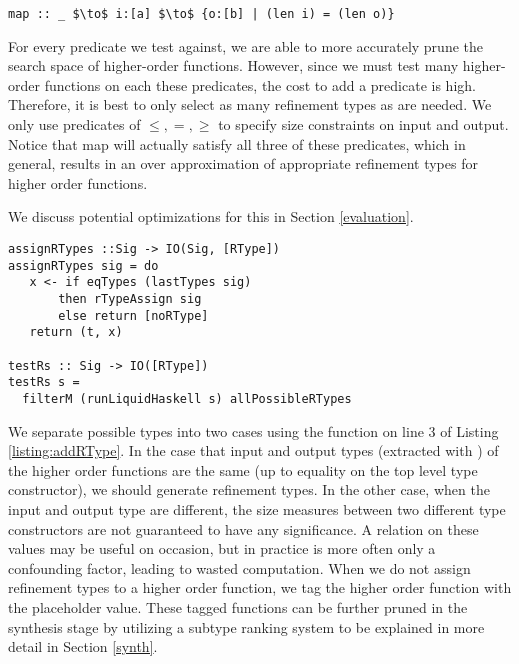 \begin{lstlisting}[numbers=none]
map :: _ $\to$ i:[a] $\to$ {o:[b] | (len i) = (len o)}
\end{lstlisting}


For every predicate we test against, we are able to more accurately prune the search space of higher-order functions.
However, since we must test many higher-order functions on each these predicates, the cost to add a predicate is high.
Therefore, it is best to only select as many refinement types as are needed.
We only use predicates of $\leq,=,\geq$ to specify size constraints on input and output.
Notice that map will actually satisfy all three of these predicates, which in general, results in an over approximation of appropriate refinement types for higher order functions.


We discuss potential optimizations for this in Section \ref{evaluation}.

\begin{lstlisting}[caption=Adding refinement types to higher order functions,label=listing:addRType]
assignRTypes ::Sig -> IO(Sig, [RType])
assignRTypes sig = do
   x <- if eqTypes (lastTypes sig) 
       then rTypeAssign sig
       else return [noRType]
   return (t, x)

testRs :: Sig -> IO([RType])
testRs s =
  filterM (runLiquidHaskell s) allPossibleRTypes
\end{lstlisting}

We separate possible types into two cases using the  function on line 3 of Listing \ref{listing:addRType}.
In the case that input and output types (extracted with ) of the higher order functions are the same (up to equality on the top level type constructor), we should generate refinement types.
In the other case, when the input and output type are different, the size measures between two different type constructors are not guaranteed to have any significance.
A relation on these values may be useful on occasion, but in practice is more often only a confounding factor, leading to wasted computation.
When we do not assign refinement types to a higher order function, we tag the higher order function with the placeholder  value.
These  tagged functions can be further pruned in the synthesis stage by utilizing a subtype ranking system to be explained in more detail in Section \ref{synth}.

